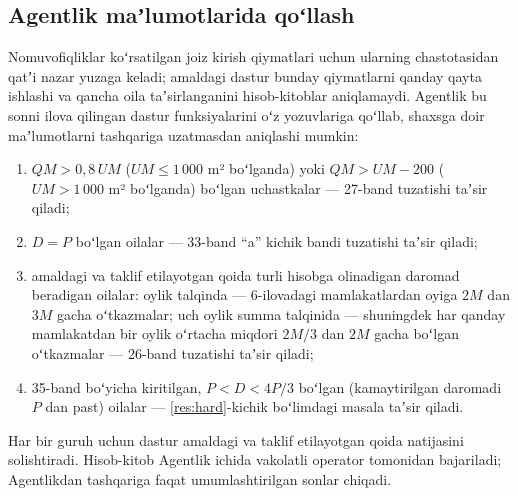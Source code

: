 \documentclass[14pt,a4paper]{extarticle}
\begin{document}
\subsection{Agentlik maʼlumotlarida qoʻllash}\label{sec:agency}
Nomuvofiqliklar koʻrsatilgan joiz kirish qiymatlari uchun ularning chastotasidan qatʼi nazar yuzaga keladi; amaldagi dastur bunday qiymatlarni qanday qayta ishlashi va qancha oila taʼsirlanganini hisob-kitoblar aniqlamaydi. Agentlik bu sonni ilova qilingan dastur funksiyalarini oʻz yozuvlariga qoʻllab, shaxsga doir maʼlumotlarni tashqariga uzatmasdan aniqlashi mumkin:
\begin{enumerate}[leftmargin=1.27cm]
\item $QM>0{,}8\,UM$ ($UM\le1\,000$ m² boʻlganda) yoki $QM>UM-200$ ($UM>1\,000$ m² boʻlganda) boʻlgan uchastkalar — 27-band tuzatishi taʼsir qiladi;
\item $D=P$ boʻlgan oilalar — 33-band “a” kichik bandi tuzatishi taʼsir qiladi;
\item amaldagi va taklif etilayotgan qoida turli hisobga olinadigan daromad beradigan oilalar: oylik talqinda — 6-ilovadagi mamlakatlardan oyiga $2M$ dan $3M$ gacha oʻtkazmalar; uch oylik summa talqinida — shuningdek har qanday mamlakatdan bir oylik oʻrtacha miqdori $2M/3$ dan $2M$ gacha boʻlgan oʻtkazmalar — 26-band tuzatishi taʼsir qiladi;
\item 35-band boʻyicha kiritilgan, $P<D<4P/3$ boʻlgan (kamaytirilgan daromadi $P$ dan past) oilalar — \ref{res:hard}-kichik boʻlimdagi masala taʼsir qiladi.
\end{enumerate}
Har bir guruh uchun dastur amaldagi va taklif etilayotgan qoida natijasini solishtiradi. Hisob-kitob Agentlik ichida vakolatli operator tomonidan bajariladi; Agentlikdan tashqariga faqat umumlashtirilgan sonlar chiqadi.
\end{document}
